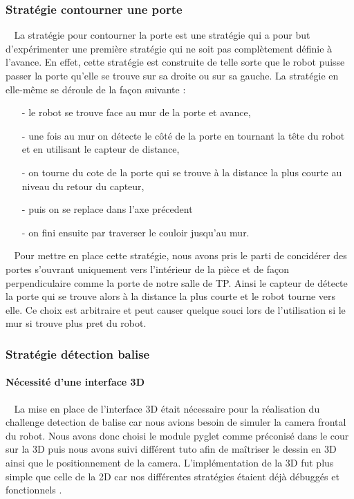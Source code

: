 \documentclass[12pt]{article}
\def\tab{$\>\>\>\>$}
\begin{document}
\subsubsection{Stratégie contourner une porte}
\tab La stratégie pour contourner la porte est une stratégie qui a pour but d'expérimenter une première stratégie qui ne soit pas complètement définie à l'avance. En effet, cette stratégie est construite de telle sorte que le robot puisse passer la porte qu'elle se trouve sur sa droite ou sur sa gauche. La stratégie en elle-même se déroule de la façon suivante : \begin{itemize}
\item[-] le robot se trouve face au mur de la porte et avance,
\item[-] une fois au mur on détecte le côté de la porte en tournant la tête du robot et en utilisant le capteur de distance,
\item[-] on tourne du cote de la porte qui se trouve à la distance la plus courte au niveau du retour du capteur,
\item[-] puis on se replace dans l'axe précedent
\item[-] on fini ensuite par traverser le couloir jusqu'au mur.
\end{itemize}
\tab Pour mettre en place cette stratégie, nous avons pris le parti de concidérer des portes s'ouvrant uniquement vers l'intérieur de la pièce et de façon perpendiculaire comme la porte de notre salle de TP. Ainsi le capteur de détecte la porte qui se trouve alors à la distance la plus courte et le robot tourne vers elle. Ce choix est arbitraire et peut causer quelque souci lors de l'utilisation si le mur si trouve plus pret du robot.

\subsubsection{Stratégie détection balise}
\paragraph{Nécessité d'une interface 3D \\}
\tab La mise en place de l'interface 3D était nécessaire pour la réalisation du challenge detection de balise car nous avions besoin de simuler la camera frontal du robot. Nous avons donc choisi le module pyglet comme préconisé dans le cour sur la 3D puis nous avons suivi différent tuto afin de maîtriser le dessin en 3D ainsi que le positionnement de la camera. L'implémentation de la 3D fut plus simple que celle de la 2D car nos différentes stratégies étaient déjà débuggés et fonctionnels .
\end{document}
